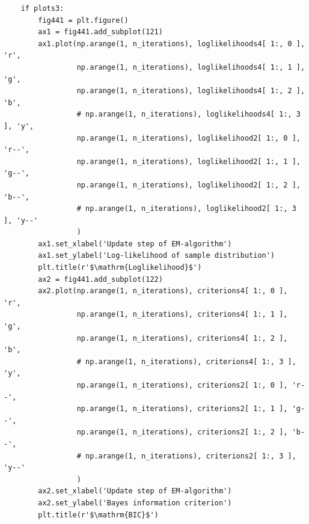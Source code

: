 \begin{verbatim}
    if plots3:
        fig441 = plt.figure()
        ax1 = fig441.add_subplot(121)
        ax1.plot(np.arange(1, n_iterations), loglikelihoods4[ 1:, 0 ], 'r',
                 np.arange(1, n_iterations), loglikelihoods4[ 1:, 1 ], 'g',
                 np.arange(1, n_iterations), loglikelihoods4[ 1:, 2 ], 'b',
                 # np.arange(1, n_iterations), loglikelihoods4[ 1:, 3 ], 'y',
                 np.arange(1, n_iterations), loglikelihood2[ 1:, 0 ], 'r--',
                 np.arange(1, n_iterations), loglikelihood2[ 1:, 1 ], 'g--',
                 np.arange(1, n_iterations), loglikelihood2[ 1:, 2 ], 'b--',
                 # np.arange(1, n_iterations), loglikelihood2[ 1:, 3 ], 'y--'
                 )
        ax1.set_xlabel('Update step of EM-algorithm')
        ax1.set_ylabel('Log-likelihood of sample distribution')
        plt.title(r'$\mathrm{Loglikelihood}$')
        ax2 = fig441.add_subplot(122)
        ax2.plot(np.arange(1, n_iterations), criterions4[ 1:, 0 ], 'r',
                 np.arange(1, n_iterations), criterions4[ 1:, 1 ], 'g',
                 np.arange(1, n_iterations), criterions4[ 1:, 2 ], 'b',
                 # np.arange(1, n_iterations), criterions4[ 1:, 3 ], 'y',
                 np.arange(1, n_iterations), criterions2[ 1:, 0 ], 'r--',
                 np.arange(1, n_iterations), criterions2[ 1:, 1 ], 'g--',
                 np.arange(1, n_iterations), criterions2[ 1:, 2 ], 'b--',
                 # np.arange(1, n_iterations), criterions2[ 1:, 3 ], 'y--'
                 )
        ax2.set_xlabel('Update step of EM-algorithm')
        ax2.set_ylabel('Bayes information criterion')
        plt.title(r'$\mathrm{BIC}$')


\end{verbatim}
